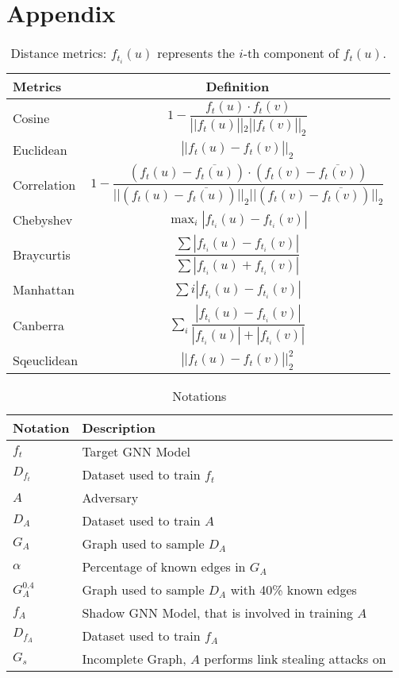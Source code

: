 \chapter*{Appendix}
    \begin{table}[h]
        \centering
        \footnotesize
        \begin{tabular}{l|c}
        \toprule
        Metrics & Definition \\
        \midrule
        Cosine & $1 - \dfrac{f_t(u)\cdot f_t(v)}{\left||f_t(u)\right||_2\left||f_t(v)\right||_2}$ \\
        Euclidean & $\left||f_t(u) - f_t(v)\right||_2$ \\
        Correlation & $1-\dfrac{(f_t(u)-\overline{f_t(u)}) \cdot(f_t(v)-\overline{f_t(v)})}{||(f_t(u)-\overline{f_t(u)})||_{2}||(f_t(v)-\overline{f_t(v)})||_{2}}$ \\
        Chebyshev & $\max _{i}\left|f_{t_i}(u)-f_{t_i}(v)\right|$ \\
        Braycurtis & $\dfrac{\sum\left|f_{t_i}(u)-f_{t_i}(v)\right|} {\sum\left|f_{t_i}(u)+f_{t_i}(v)\right|}$ \\
        Manhattan & $\sum{i}\left|f_{t_i}(u)-f_{t_i}(v)\right|$ \\
        Canberra & $\sum_{i} \dfrac{\left|f_{t_i}(u)-f_{t_i}(v)\right|}{\left|f_{t_i}(u)\right|+\left|f_{t_i}(v)\right|}$ \\
        Sqeuclidean & $\left||f_t(u) - f_t(v)\right||_2^2$ \\
        \bottomrule
        \end{tabular}
        \caption{Distance metrics: $f_{t_i}(u)$ represents the $i$-th component of $f_t(u)$.}
        \label{table:distance}
    \end{table}

    \vspace{1cm}
    \begin{table}[!h]
        \centering
        \footnotesize
        \begin{tabular}{l|l|}
          \toprule
          Notation & Description \\
          \midrule
          $f_t$ & Target GNN Model \\
          $D_{f_t}$ & Dataset used to train $f_t$ \\
          $A$ & Adversary \\
          $D_A$ & Dataset used to train $A$ \\
          $G_A$ & Graph used to sample $D_A$ \\
          $\alpha$ & Percentage of known edges in $G_A$ \\
          $G_A^{0.4}$ & Graph used to sample $D_A$ with 40\% known edges \\
          $f_A$ & Shadow GNN Model, that is involved in training $A$ \\
          $D_{f_A}$ & Dataset used to train $f_A$ \\
          $G_s$ & Incomplete Graph, $A$ performs link stealing attacks on \\
          \bottomrule
        \end{tabular}
        \caption{Notations}
        \label{table:notations}
      \end{table}


